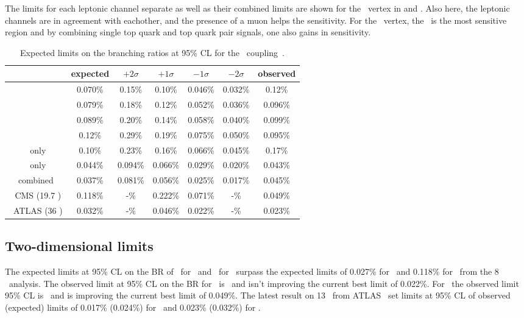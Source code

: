 The limits for each leptonic channel separate as well as their combined limits are shown for the \Zct\ vertex in  \fig{} and . Also here, the leptonic channels are in agreement with eachother, and the presence of a muon helps the sensitivity. For the \Zut\ vertex, the \TTSR\ is the most sensitive region  and by combining single top quark and top quark pair signals, one also gains in sensitivity. 

\begin{table}[htbp]
	\centering
	\caption{Expected limits on the branching ratios at 95\% CL for the \Zct\ coupling~\cite{Sirunyan:2017kkr,ATLAS-CONF-2017-070}.}
	\begin{tabular}{ccccccc}
		\toprule
		& expected & $+2\sigma$ & $+1\sigma$ & $-1\sigma$ & $-2\sigma$ & observed \\ 
		\midrule
		\mumumu\ & 0.070\% & 0.15\% & 0.10\% & 0.046\% & 0.032\% & 0.12\% \\ 
		
		\emumu\ & 0.079\% & 0.18\% & 0.12\% & 0.052\% & 0.036\% & 0.096\% \\ 
		
		\eemu\ & 0.089\% & 0.20\% & 0.14\% & 0.058\% & 0.040\% & 0.099\% \\ 
		
		\eee\ & 0.12\% & 0.29\% & 0.19\% & 0.075\% & 0.050\% & 0.095\% \\ 
		\hdashline
		\STSR\ only & 0.10\% & 0.23\% & 0.16\% & 0.066\% & 0.045\% & 0.17\% \\ 
		
		\TTSR\ only & 0.044\% & 0.094\% & 0.066\% & 0.029\% & 0.020\% & 0.043\% \\ 
		\hdashline 
		combined & 0.037\% & 0.081\% & 0.056\% & 0.025\% & 0.017\% & 0.045\% \\ 
		\hdashline
		8 \TeV\ CMS (19.7 \fbinv)    & 0.118\% & -\% &0.222\% & 0.071\% & -\% & 0.049\%\\
		\hdashline
		13 \TeV\ ATLAS (36 \fbinv)    & 0.032\% & -\% & 0.046\% & 0.022\%& -\% & 0.023\%\\
		\hline
	\end{tabular} 
	\label{tab:ResultsTZC}
\end{table}

\subsection{Two-dimensional limits}


The expected limits at 95\% CL on the BR of \BRZut\ for \Zut\ and \BRZct\ for \Zct\ surpass the expected limits of 0.027\% for \Zut\ and 0.118\% for \Zct\ from the 8 \TeV\ analysis. The observed limit at 95\% CL on the BR for \Zut\ is \BRZuto\ and isn't improving the current best limit of 0.022\%. For \Zct\ the observed limit 95\% CL is \BRZcto\ and is improving the current best limit of 0.049\%.  The latest result on 13 \TeV\ from ATLAS~\cite{ATLAS-CONF-2017-070} set limits at 95\% CL of 
observed (expected) limits of 0.017\% (0.024\%) for \Zut\ and 0.023\% (0.032\%) for \Zct. 



